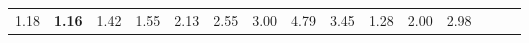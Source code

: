 \begin{tabular}{ll|rrrrrrrrr|rrrr}
  


  
  1.18 & \textbf{1.16} & 1.42 & 1.55 & 2.13 & 2.55 & 3.00 & 4.79 & 3.45 & 1.28 & 2.00 & 2.98 &  \\


\end{tabular}

